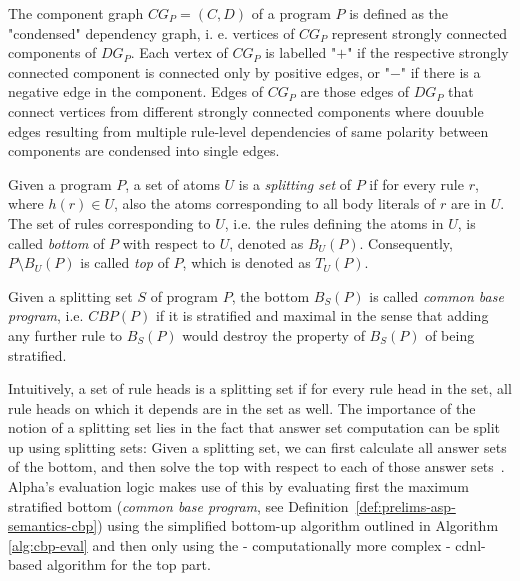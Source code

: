 \begin{definition}
\label{def:prelims-asp-semantics-compgraph}
The component graph $\mathit{CG}_P = (C, D)$ of a program $P$ is defined as the "condensed" dependency graph, i. e. vertices of $\mathit{CG}_P$ represent strongly connected components of $\mathit{DG}_P$. Each vertex of $\mathit{CG}_P$ is labelled "$+$" if the respective strongly connected component is connected only by positive edges, or "$-$" if there is a negative edge in the component. Edges of $\mathit{CG}_P$ are those edges of $\mathit{DG}_P$ that connect vertices from different strongly connected components where douuble edges resulting from multiple rule-level dependencies of same polarity between components are condensed into single edges.
\end{definition}

\begin{definition}
\label{def:prelims-asp-semantics-splitting-set}
Given a program $P$, a set of atoms $U$ is a \emph{splitting set} of $P$ if for every rule $r$, where $h(r) \in U$, also the atoms corresponding to all body literals of $r$ are in $U$. The set of rules corresponding to $U$, i.e. the rules defining the atoms in $U$, is called \emph{bottom} of $P$ with respect to $U$, denoted as $B_U(P)$. Consequently, $P \setminus B_U(P)$ is called \emph{top} of $P$, which is denoted as $T_U(P)$.
\end{definition}

\begin{definition}
\label{def:prelims-asp-semantics-cbp}
Given a splitting set $S$ of program $P$, the bottom $B_S(P)$ is called \emph{common base program}, i.e. $CBP(P)$ if it is stratified and maximal in the sense that adding any further rule to $B_S(P)$ would destroy the property of $B_S(P)$ of being stratified.
\end{definition}

Intuitively, a set of rule heads is a splitting set if for every rule head in the set, all rule heads on which it depends are in the set as well. The importance of the notion of a splitting set lies in the fact that answer set computation can be split up using splitting sets: Given a splitting set, we can first calculate all answer sets of the bottom, and then solve the top with respect to each of those answer sets~\cite{splitting-sets}.\\

Alpha's evaluation logic makes use of this by evaluating first the maximum stratified bottom (\emph{common base program}, see Definition~\ref{def:prelims-asp-semantics-cbp}) using the simplified bottom-up algorithm outlined in Algorithm \ref{alg:cbp-eval} and then only using the - computationally more complex - \gls{cdnl}-based algorithm for the top part.

